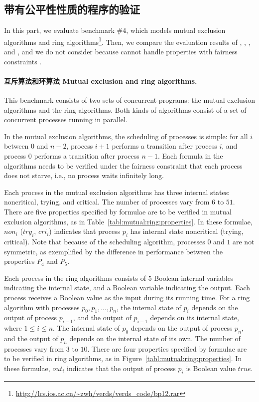 \subsection{带有公平性性质的程序的验证}\label{subsec:fair}
In this part, we evaluate benchmark \#4, which models mutual exclusion
algorithms and ring
algorithms\footnote{\url{http://lcs.ios.ac.cn/~zwh/verds/verds_code/bp12.rar}}.
Then, we compare the evaluation results of \sctl{}, \verds{},
\nusmv{}, and \nuxmv{}, and we do not consider 
because  cannot handle \CTL{} properties with
fairness constraints \cite{Ji15}.


\paragraph{互斥算法和环算法 Mutual exclusion and ring algorithms.}

This benchmark consists of two sets of concurrent programs: the mutual
exclusion algorithms and the ring algorithms. Both kinds of algorithms
consist of a set of concurrent processes running in parallel. 


In the mutual exclusion algorithms, the scheduling of processes is simple: for all $i$ between $0$ and $n-2$, process $i+1$ performs a transition after process $i$, and process $0$ performs a transition after process $n-1$.
Each formula in the algorithms needs to be
verified under the fairness constraint that each process does not
starve, i.e., no process waits infinitely long.

Each process in the mutual exclusion algorithms has three internal
states: \textsf{noncritical}, \textsf{trying}, and
\textsf{critical}. The number of processes vary from $6$ to $51$. There
are five properties specified by \CTL{} formulae are to be verified in
mutual exclusion algorithms, as in
Table~\ref{tabl:mutual:ring:properties}. In these formulae, $non_i$
($try_i$, $cri_i$) indicates that process $p_i$ has internal state
\textsf{noncritical} (\textsf{trying}, \textsf{critical}).
Note that because of the scheduling algorithm, 
processes $0$ and $1$ are not symmetric, as exemplified by the 
difference in performance between the properties $P_4$ and $P_5$.

Each process in the ring algorithms consists of $5$ Boolean internal variables indicating the internal state, and a Boolean variable indicating the output. Each process receives a Boolean value as the input during its running time. For a ring algorithm with processes $p_0,p_1,...,p_n$, the internal state of $p_i$ depends on the output of process $p_{i-1}$, and the output of $p_{i-1}$ depends on its internal state, where $1\le i\le n$. The internal state of $p_0$ depends on the output of process $p_n$, and the output of $p_n$ depends on the internal state of its own. The number of processes vary from $3$ to $10$. There are four properties specified by \CTL{} formulae are to be verified in ring algorithms, as in Figure~\ref{tabl:mutual:ring:properties}. In these formulae, $out_i$ indicates that the output of process $p_i$ is Boolean value $true$.


